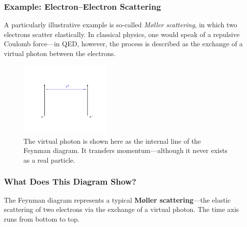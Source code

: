 \subsubsection*{Example: Electron–Electron Scattering}
A particularly illustrative example is so-called \emph{Møller scattering}, in which two electrons scatter elastically. In classical physics, one would speak of a repulsive Coulomb force—in QED, however, the process is described as the exchange of a virtual photon between the electrons.
\begin{figure}[H]
	\begin{center}
		\includegraphics[width=0.4\textwidth]{bilder/moeller-diagramm.pdf}
	\end{center}
	\caption{The virtual photon is shown here as the internal line of the Feynman diagram. It transfers momentum—although it never exists as a real particle.}
\end{figure}

\subsubsection*{What Does This Diagram Show?}
The Feynman diagram represents a typical \textbf{Møller scattering}—the elastic scattering of two electrons via the exchange of a virtual photon. The time axis runs from bottom to top.

